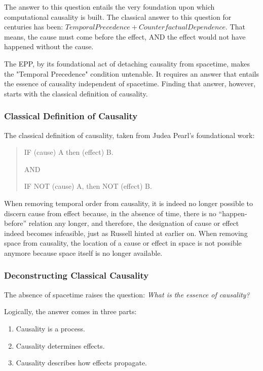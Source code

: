 The answer to this question entails the very foundation upon which computational causality is built. 
The classical answer to this question for centuries has been: $Temporal Precedence + Counterfactual Dependence$.
That means, the cause must come before the effect, AND the effect would not have happened without the cause. 

The EPP, by its foundational act of detaching causality from spacetime, makes the "Temporal Precedence" condition untenable. 
It requires an answer that entails the essence of causality independent of spacetime. Finding that answer, however, 
starts with the classical definition of causality.


\subsubsection{Classical Definition of Causality}


The classical definition of causality, taken from Judea Pearl's foundational work\cite{pearl2000causality}: 

\begin{quote}
    IF (cause) A then (effect) B.
    
    AND 
    
    IF NOT (cause) A, then NOT (effect) B.
\end{quote}

When removing temporal order from causality, it is indeed no longer possible to discern cause from effect because, in the absence of time, there is no “happen-before” relation any longer, and therefore, the designation of cause or effect indeed becomes infeasible, just as Russell hinted at earlier on. When removing space from causality, the location of a cause or effect in space is not possible anymore because space itself is no longer available. 

\subsubsection{Deconstructing Classical Causality}

The absence of spacetime raises the question: \textit{What is the essence of causality?}

Logically, the answer comes in three parts:

\begin{enumerate}
    \item Causality is a process.
    \item Causality determines effects.
    \item Causality describes how effects propagate.
\end{enumerate}


